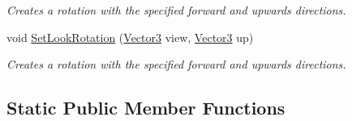 \begin{DoxyCompactItemize}
\begin{DoxyCompactList}\small\item\em Creates a rotation with the specified forward and upwards directions. \end{DoxyCompactList}\item 
void \mbox{\hyperlink{class_lua_1_1_quaternion_a13062d4cdfe3635c74f2e57c893b6e2f}{Set\+Look\+Rotation}} (\mbox{\hyperlink{class_lua_1_1_vector3}{Vector3}} view, \mbox{\hyperlink{class_lua_1_1_vector3}{Vector3}} up)
\begin{DoxyCompactList}\small\item\em Creates a rotation with the specified forward and upwards directions. \end{DoxyCompactList}\end{DoxyCompactItemize}
\subsection*{Static Public Member Functions}
